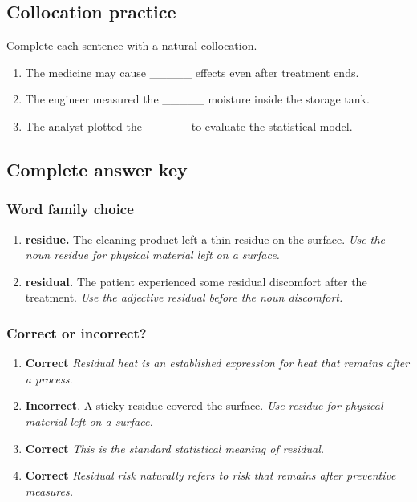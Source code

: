 \documentclass[11pt]{article}
\begin{document}
\subsection{Collocation practice}
Complete each sentence with a natural collocation.

\begin{enumerate}
  \item The medicine may cause \_\_\_\_\_ effects even after treatment ends.
  \item The engineer measured the \_\_\_\_\_ moisture inside the storage tank.
  \item The analyst plotted the \_\_\_\_\_ to evaluate the statistical model.
\end{enumerate}

\subsection{Complete answer key}
\subsubsection{Word family choice}
\begin{enumerate}
  \item \textbf{residue.} The cleaning product left a thin residue on the surface. \emph{Use the noun residue for physical material left on a surface.}
  \item \textbf{residual.} The patient experienced some residual discomfort after the treatment. \emph{Use the adjective residual before the noun discomfort.}
\end{enumerate}

\subsubsection{Correct or incorrect?}
\begin{enumerate}
  \item \textbf{Correct} \emph{Residual heat is an established expression for heat that remains after a process.}
  \item \textbf{Incorrect}. A sticky residue covered the surface. \emph{Use residue for physical material left on a surface.}
  \item \textbf{Correct} \emph{This is the standard statistical meaning of residual.}
  \item \textbf{Correct} \emph{Residual risk naturally refers to risk that remains after preventive measures.}
\end{enumerate}
\end{document}
